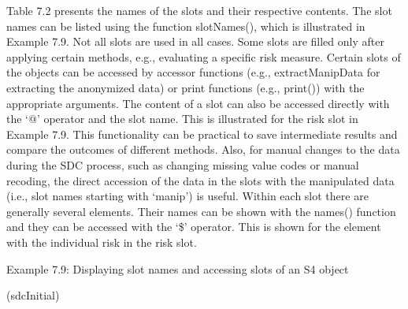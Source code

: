 \documentclass[letterpaper,10pt,english]{sphinxmanual}
\begin{document}
\begin{DUlineblock}{0em}
\item[] \sphinxcode{\sphinxupquote{\#\#}}
\item[] 
\item[] \sphinxcode{\sphinxupquote{\#\#}}
\item[] 
\item[] 
\item[] 
\item[] \sphinxcode{\sphinxupquote{\#\# -{-}-{-}-{-}-{-}-{-}-{-}-{-}-{-}-{-}-{-}-{-}-{-}-{-}-{-}-{-}-{-}-{-}-{-}-{-}-{-}-{-}-{-}-{-}-{-}-{-}-{-}-{-}-{-}-{-}-{-}-{-}-{-}-{-}-{-}-{-}-{-}-{-}-}}
\end{DUlineblock}

Table 7.2 presents the names of the slots and their respective contents.
The slot names can be listed using the function slotNames(), which is
illustrated in Example 7.9. Not all slots are used in all cases. Some
slots are filled only after applying certain methods, e.g., evaluating a
specific risk measure. Certain slots of the objects can be accessed by
accessor functions (e.g., extractManipData for extracting the anonymized
data) or print functions (e.g., print()) with the appropriate arguments.
The content of a slot can also be accessed directly with the ‘@’
operator and the slot name. This is illustrated for the risk slot in
Example 7.9. This functionality can be practical to save intermediate
results and compare the outcomes of different methods. Also, for manual
changes to the data during the SDC process, such as changing missing
value codes or manual recoding, the direct accession of the data in the
slots with the manipulated data (i.e., slot names starting with ‘manip’)
is useful. Within each slot there are generally several elements. Their
names can be shown with the names() function and they can be accessed
with the ‘\$’ operator. This is shown for the element with the individual
risk in the risk slot.

Example 7.9: Displaying slot names and accessing slots of an S4 object

\begin{DUlineblock}{0em}
\item[] 
\item[] (sdcInitial)
\end{DUlineblock}
\end{document}
